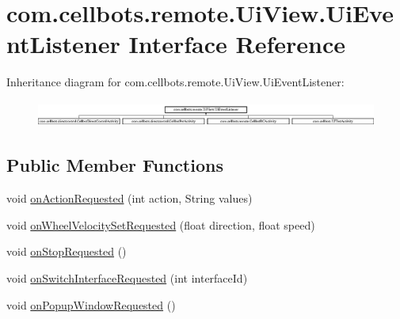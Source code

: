 \hypertarget{interfacecom_1_1cellbots_1_1remote_1_1_ui_view_1_1_ui_event_listener}{\section{com.\-cellbots.\-remote.\-Ui\-View.\-Ui\-Event\-Listener Interface Reference}
\label{interfacecom_1_1cellbots_1_1remote_1_1_ui_view_1_1_ui_event_listener}
}
Inheritance diagram for com.\-cellbots.\-remote.\-Ui\-View.\-Ui\-Event\-Listener\-:\begin{figure}[H]
\begin{center}
\leavevmode
\includegraphics[height=0.861538cm]{interfacecom_1_1cellbots_1_1remote_1_1_ui_view_1_1_ui_event_listener}
\end{center}
\end{figure}
\subsection*{Public Member Functions}
\begin{DoxyCompactItemize}
\item 
void \hyperlink{interfacecom_1_1cellbots_1_1remote_1_1_ui_view_1_1_ui_event_listener_af7320a4f9037c74ed1f4f912e8d2caac}{on\-Action\-Requested} (int action, String values)
\item 
void \hyperlink{interfacecom_1_1cellbots_1_1remote_1_1_ui_view_1_1_ui_event_listener_a7912ec147aa882d7c0bf6b8a229ddfd9}{on\-Wheel\-Velocity\-Set\-Requested} (float direction, float speed)
\item 
void \hyperlink{interfacecom_1_1cellbots_1_1remote_1_1_ui_view_1_1_ui_event_listener_aa32f78f97e959fe7212b0ce4db2cd616}{on\-Stop\-Requested} ()
\item 
void \hyperlink{interfacecom_1_1cellbots_1_1remote_1_1_ui_view_1_1_ui_event_listener_a5e14db43eb3e72683b42d08bf4222741}{on\-Switch\-Interface\-Requested} (int interface\-Id)
\item 
void \hyperlink{interfacecom_1_1cellbots_1_1remote_1_1_ui_view_1_1_ui_event_listener_a83e7a945fb951b90b2f58fb3807a02bb}{on\-Popup\-Window\-Requested} ()
\end{DoxyCompactItemize}
